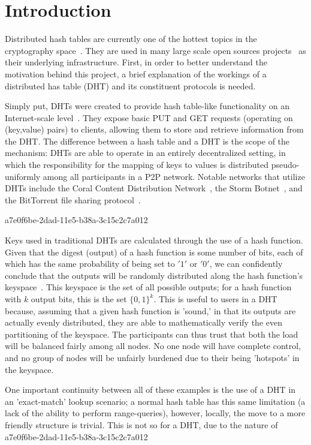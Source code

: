 \documentclass[12pt]{article}
\begin{document}
\section{Introduction}
\par Distributed hash tables are currently one of the hottest topics in the cryptography space~\cite{Stoica:2001dj,Rowstron:2001ea,Ratnasamy:2001wn}. They are used in many large scale open sources projects~\cite{Freitas:2013tb,Xu:2010vs,Perfitt:2010fh} as their underlying infrastructure. First, in order to better understand the motivation behind this project, a brief explanation of the workings of a distributed has table (DHT) and its constituent protocols is needed.

\par Simply put, DHTs were created to provide hash table-like functionality on an Internet-scale level~\cite{Ratnasamy:2001wn}. They expose basic PUT and GET requests (operating on (key,value) pairs) to clients, allowing them to store and retrieve information from the DHT. The difference between a hash table and a DHT is the scope of the mechanism: DHTs are able to operate in an entirely decentralized setting, in which the responsibility for the mapping of keys to values is distributed pseudo-uniformly among all participants in a P2P network. Notable networks that utilize DHTs include the Coral Content Distribution Network~\cite{Freedman:2004vb}, the Storm Botnet~\cite{Holz:2008uk}, and the BitTorrent file sharing protocol~\cite{Cohen:y1_8mBnw}.

a7e0f6be-2dad-11e5-b38a-3c15c2c7a012\par Keys used in traditional DHTs are calculated through the use of a hash function. Given that the digest (output) of a hash function is some number of bits, each of which has the same probability of being set to $'1'$ or $'0'$, we can confidently conclude that the outputs will be randomly distributed along the hash function's keyspace~. This keyspace is the set of all possible outputs; for a hash function with $k$ output bits, this is the set $\{0,1\}^k$. This is useful to users in a DHT because, assuming that a given hash function is 'sound,' in that its outputs are actually evenly distributed, they are able to mathematically verify the even partitioning of the keyspace. The participants can thus trust that both the load will be balanced fairly among all nodes. No one node will have complete control, and no group of nodes will be unfairly burdened due to their being 'hotspots' in the keyspace.~

\par One important continuity between all of these examples is the use of a DHT in an 'exact-match' lookup scenario; a normal hash table has this same limitation (a lack of the ability to perform range-queries), however, locally, the move to a more friendly structure is trivial. This is not so for a DHT, due to the nature of
a7e0f6be-2dad-11e5-b38a-3c15c2c7a012\printbibliography
\end{document}
